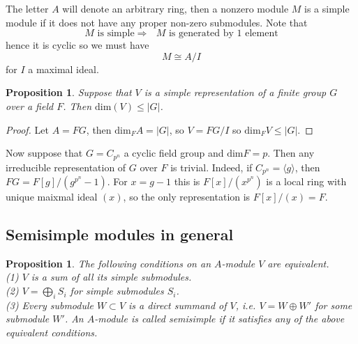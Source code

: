 \documentclass{article}
\theoremstyle{definition}
\theoremstyle{remark}
\theoremstyle{plain}
\newtheorem{proposition}[theorem]{Proposition}
\begin{document}
The letter $A$ will denote an arbitrary ring, then a nonzero module $M$ is a simple module if it does not have any proper non-zero submodules.
Note that
\[ \text{$M$ is simple} \Longrightarrow \text{ $M$ is generated by 1 element}\]
hence it is cyclic so we must have
\[M \cong A/I\]
for $I$ a maximal ideal.

\begin{proposition}
	Suppose that $V$ is a simple representation of a finite group $G$ over  a field $F$. Then $\text{dim}(V) \leq |G|$. 
\end{proposition}
 \begin{proof}
	 Let $A = FG$, then $\text{dim}_F A = |G|$, so $V = FG/I$ so $\text{dim}_F V \leq |G|$.
 \end{proof}
 
 Now suppose that $G = C_{p^n}$ a cyclic field group and $\text{dim} F = p$.
 Then any irreducible representation of $G$ over $F$ is trivial. 
 Indeed, if $C_{p^n} = \langle g \rangle$, then $FG = F[g]/(g^{p^n}-1)$.
 For $x = g-1$ this is $F[x]/(x^{p^n})$ is a local ring with unique maixmal ideal $(x)$, so the only representation is $F[x]/(x) = F$.

 \subsection{Semisimple modules in general}

 \begin{proposition}
	 The following conditions on an $A$-module $V$ are equivalent.\\
	 \indent (1) $V$ is a sum of all its simple submodules.\\
	 \indent (2) $V = \bigoplus_i S_i$ for simple submodules $S_i$.\\
	 \indent (3) Every submodule $W \subset V$ is a direct summand of $V$, i.e. $V = W \oplus W'$ for some submodule $W'$.
	 An $A$-module is called \textit{semisimple} if it satisfies any of the above equivalent conditions.
 \end{proposition}
 
\end{document}
